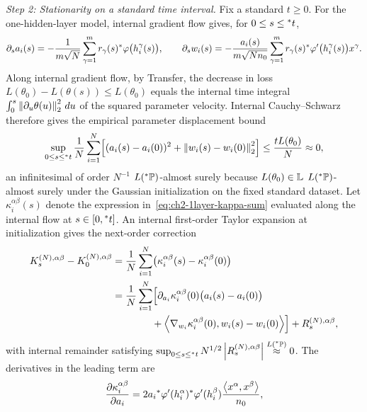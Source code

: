 \begin{proofsketch}
\emph{Step 2: Stationarity on a standard time interval.} Fix a standard $t \ge 0$. For the one-hidden-layer model, internal gradient flow gives, for $0 \le s \le {}^*t$,
\begin{equation}\label{eq:ch2-1layer-gf-coords}
\partial_s a_i(s) = -\frac{1}{m\sqrt{N}} \sum_{\gamma=1}^{m} r_\gamma(s) {}^*\varphi\bigl(h_i^\gamma(s)\bigr), \qquad
\partial_s w_i(s) = -\frac{a_i(s)}{m\sqrt{N n_0}} \sum_{\gamma=1}^{m} r_\gamma(s) {}^*\varphi'\bigl(h_i^\gamma(s)\bigr) x^\gamma.
\end{equation}
Along internal gradient flow, by Transfer, the decrease in loss $L(\theta_0) - L(\theta(s)) \le L(\theta_0)$ equals the internal time integral $\int_0^s \left\lVert \partial_u \theta(u) \right\rVert_2^2\, du$ of the squared parameter velocity. Internal Cauchy--Schwarz therefore gives the empirical parameter displacement bound
\begin{equation}\label{eq:ch2-1layer-disp-bound}
\sup_{0 \le s \le {}^*t} \frac{1}{N} \sum_{i=1}^{N} \Bigl[(a_i(s) - a_i(0))^2 + \left\lVert w_i(s) - w_i(0) \right\rVert_2^2\Bigr] \le \frac{t L(\theta_0)}{N} \approx 0,
\end{equation}
an infinitesimal of order $N^{-1}$ $L({}^*\mathbb{P})$-almost surely because $L(\theta_0) \in \mathbb{L}$ $L({}^*\mathbb{P})$-almost surely under the Gaussian initialization on the fixed standard dataset. Let $\kappa_i^{\alpha\beta}(s)$ denote the expression in~\eqref{eq:ch2-1layer-kappa-sum} evaluated along the internal flow at $s \in [0, {}^*t]$. An internal first-order Taylor expansion at initialization gives the next-order correction
\begin{equation}\label{eq:ch2-1layer-taylor}
\begin{aligned}
K_s^{(N),\alpha\beta} - K_0^{(N),\alpha\beta}
&= \frac{1}{N} \sum_{i=1}^{N} \bigl(\kappa_i^{\alpha\beta}(s) - \kappa_i^{\alpha\beta}(0)\bigr) \\
&= \frac{1}{N} \sum_{i=1}^{N} \Bigl[ \partial_{a_i} \kappa_i^{\alpha\beta}(0)\bigl(a_i(s) - a_i(0)\bigr) \\
&\qquad\qquad + \left\langle \nabla_{w_i}\kappa_i^{\alpha\beta}(0), w_i(s) - w_i(0) \right\rangle \Bigr] + R_s^{(N),\alpha\beta},
\end{aligned}
\end{equation}
with internal remainder satisfying $\sup_{0 \le s \le {}^*t} N^{1/2}\left\lvert R_s^{(N),\alpha\beta} \right\rvert \stackrel{L({}^*\mathbb{P})}{\approx} 0$. The derivatives in the leading term are
\begin{align}
\frac{\partial \kappa_i^{\alpha\beta}}{\partial a_i} &= 2 a_i \ns{\varphi}'(h_i^\alpha)\ns{\varphi}'(h_i^\beta) \frac{\ip{x^\alpha}{x^\beta}}{n_0}, \label{eq:ch2-1layer-dkappa-da} \\

\end{align}
\end{proofsketch}
